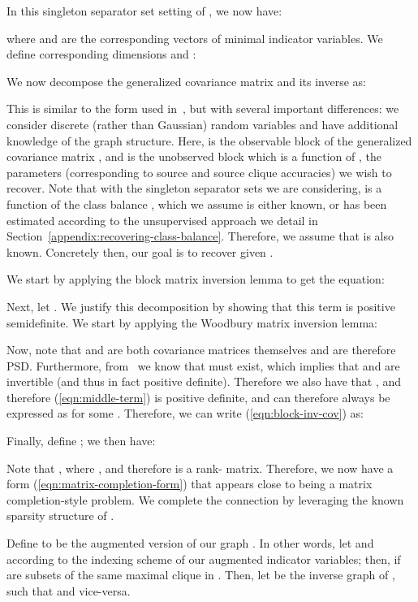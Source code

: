 \documentclass[letterpaper]{article}
\begin{document}
\begin{appendix}
In this singleton separator set setting of , we now have:

where  and  are the corresponding vectors of minimal indicator variables.
We define corresponding dimensions  and :


We now decompose the generalized covariance matrix and its inverse as:

This is similar to the form used in~\cite{chandrasekaran2010latent}, but with several important differences: we consider discrete (rather than Gaussian) random variables and have additional knowledge of the graph structure.
Here,  is the observable block of the generalized covariance matrix , and  is the unobserved block which is a function of , the parameters (corresponding to source and source clique accuracies) we wish to recover.
Note that with the singleton separator sets we are considering,  is a function of the class balance , which we assume is either known, or has been estimated according to the unsupervised approach we detail in Section~\ref{appendix:recovering-class-balance}.
Therefore, we assume that  is also known.
Concretely then, our goal is to recover  given .

We start by applying the block matrix inversion lemma to get the equation:


Next, let .
We justify this decomposition by showing that this term is positive semidefinite.
We start by applying the Woodbury matrix inversion lemma:

Now, note that  and  are both covariance matrices themselves and are therefore PSD.
Furthermore, from~\cite{loh2012structure} we know that  must exist, which implies that  and  are invertible (and thus in fact positive definite).
Therefore we also have that , and therefore (\ref{eqn:middle-term}) is positive definite, and can therefore always be expressed as  for some .
Therefore, we can write (\ref{eqn:block-inv-cov}) as:

Finally, define ; we then have:

Note that , where , and therefore  is a rank- matrix.
Therefore, we now have a form (\ref{eqn:matrix-completion-form}) that appears close to being a matrix completion-style problem.
We complete the connection by leveraging the known sparsity structure of .

Define  to be the augmented version of our graph .
In other words, let  and  according to the indexing scheme of our augmented indicator variables; then,  if  are subsets of the same maximal clique in .
Then, let  be the inverse graph of , such that  and vice-versa.


\end{appendix}
\end{document}
